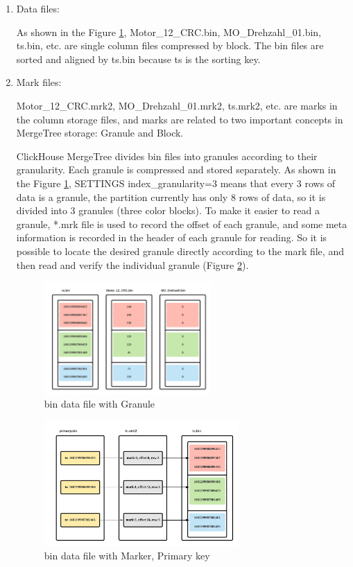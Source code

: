 \begin{enumerate}

    \item Data files: 
    
    As shown in the Figure \ref{fig:ch_granule}, Motor\_12\_CRC.bin, MO\_Drehzahl\_01.bin, ts.bin, etc. are single column files compressed by block. The bin files are sorted and aligned by ts.bin because ts is the sorting key.
    
    \item Mark files:
    
    Motor\_12\_CRC.mrk2, MO\_Drehzahl\_01.mrk2, ts.mrk2, etc. are marks in the column storage files, and marks are related to two important concepts in MergeTree storage: Granule and Block.
    
    ClickHouse MergeTree divides bin files into granules according to their granularity. Each granule is compressed and stored separately. As shown in the Figure \ref{fig:ch_granule}, SETTINGS index\_granularity=3 means that every 3 rows of data is a granule, the partition currently has only 8 rows of data, so it is divided into 3 granules (three color blocks). To make it easier to read a granule, *.mrk file is used to record the offset of each granule, and some meta information is recorded in the header of each granule for reading\cite{alibaba_cloud_community}. So it is possible to locate the desired granule directly according to the mark file, and then read and verify the individual granule (Figure \ref{fig:ch_mark}).
    
    \begin{figure}[hbt!]
    \centering
    \includegraphics[width=0.6\textwidth]{gfx/bin_data_ch.png}
    \caption{bin data file with Granule}
    \label{fig:ch_granule}
    \end{figure}
    
        \begin{figure}[hbt!]
    \centering
    \includegraphics[width=0.7\textwidth]{gfx/mrk_primary_ch.png}
    \caption{bin data file with Marker, Primary key}
    \label{fig:ch_mark}
    \end{figure}


\end{enumerate}
